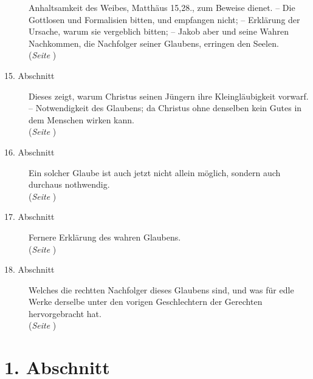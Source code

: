 \begin{description}
Anhaltsamkeit des Weibes, Matthäus 15,28., zum Beweise dienet. -- Die Gottlosen
und Formalisien bitten, und empfangen nicht; -- Erklärung der Ursache, warum sie
vergeblich bitten; -- Jakob aber und seine Wahren Nachkommen, die Nachfolger
seiner Glaubens, erringen
den Seelen.
\\(\textit{Seite \pageref{kap6_ab14}})
\item[15. Abschnitt] Dieses zeigt, warum Christus seinen Jüngern ihre
Kleingläubigkeit vorwarf. -- Notwendigkeit des Glaubens; da Christus ohne
denselben kein Gutes in dem Menschen wirken kann.
\\(\textit{Seite \pageref{kap6_ab15}})
\item[16. Abschnitt] Ein solcher Glaube ist auch jetzt nicht allein möglich,
sondern auch durchaus nothwendig.
\\(\textit{Seite \pageref{kap6_ab16}})
\item[17. Abschnitt] Fernere Erklärung des wahren Glaubens.
\\(\textit{Seite \pageref{kap6_ab17}})
\item[18. Abschnitt] Welches die rechtten Nachfolger dieses Glaubens sind, und
was für edle Werke derselbe unter den vorigen Geschlechtern der Gerechten
hervorgebracht hat.
\\(\textit{Seite \pageref{kap6_ab18}})

\end{description}
\normalsize


\section{1. Abschnitt} \label{kap6_ab1}

